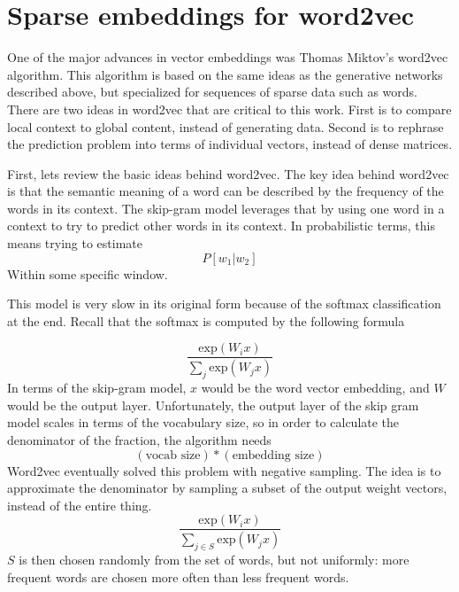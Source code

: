 \documentclass{article}
\newcommand{\exp}{\text{exp}}
\begin{document}
	
	
	\section{Sparse embeddings for word2vec}
	
	One of the major advances in vector embeddings was Thomas Miktov's word2vec algorithm. This algorithm is based on the same ideas as the generative networks described above, but specialized for sequences of sparse data such as words. There are two ideas in word2vec that are critical to this work. First is to compare local context to global content, instead of generating data. Second is to rephrase the prediction problem into terms of individual vectors, instead of dense matrices. 
	
	First, lets review the basic ideas behind word2vec. The key idea behind word2vec is that the semantic meaning of a word can be described by the frequency of the words in its context. The skip-gram model leverages that by using one word in a context to try to predict other words in its context. In probabilistic terms, this means trying to estimate
	$$P[w_1 | w_2]$$ Within some specific window.  
	
	
	This model is very slow in its original form because of the softmax classification at the end. Recall that the softmax is computed by the following formula
	
	$$ \frac{\exp(W_i x)}{\sum_j \exp(W_j x)}$$
	In terms of the skip-gram model, $x$ would be the word vector embedding, and $W$ would be the output layer. Unfortunately, the output layer of the skip gram model scales in terms of the vocabulary size, so in order to calculate the denominator of the fraction, the algorithm needs $$(\text{vocab size}) * (\text{embedding size})$$
	Word2vec eventually solved this problem with negative sampling. The idea is to approximate the denominator by sampling a subset of the output weight vectors, instead of the entire thing. 
	$$ \frac{\exp(W_i x)}{\sum_{j \in S} \exp(W_j x)}$$
	$S$ is then chosen randomly from the set of words, but not uniformly: more frequent words are chosen more often than less frequent words. 
	
\end{document}
